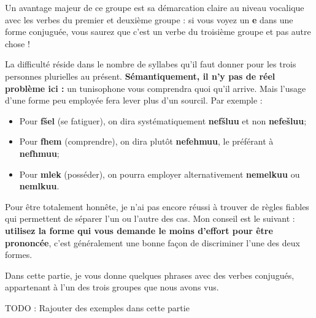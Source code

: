 Un avantage majeur de ce groupe est sa démarcation claire au niveau vocalique avec les verbes du premier et deuxième groupe : si vous voyez un \textbf{e} dans une forme conjuguée, vous saurez que c'est un verbe du troisième groupe et pas autre chose ! 

La difficulté réside dans le nombre de syllabes qu'il faut donner pour les trois personnes plurielles au présent. \textbf{Sémantiquement, il n'y pas de réel problème ici :} un tunisophone vous comprendra quoi qu'il arrive. Mais l'usage d'une forme peu employée fera lever plus d'un sourcil. Par exemple :
 \begin{itemize}
     \item Pour \textbf{f\v{s}el} (se fatiguer), on dira systématiquement \textbf{nef\v{s}luu} et non \textbf{nefe\v{s}luu};
     \item Pour \textbf{fhem} (comprendre), on dira plutôt \textbf{nefehmuu}, le préférant à \textbf{nefhmuu};
     \item Pour \textbf{mlek} (posséder), on pourra employer alternativement \textbf{nemelkuu} ou \textbf{nemlkuu}.
 \end{itemize}

Pour être totalement honnête, je n'ai pas encore réussi à trouver de règles fiables qui permettent de séparer l'un ou l'autre des cas. Mon conseil est le suivant : \textbf{utilisez la forme qui vous demande le moins d'effort pour être prononcée}, c'est généralement une bonne façon de discriminer l'une des deux formes.

Dans cette partie, je vous donne quelques phrases avec des verbes conjugués, appartenant à l'un des trois groupes que nous avons vus. 

TODO : Rajouter des exemples dans cette partie 
